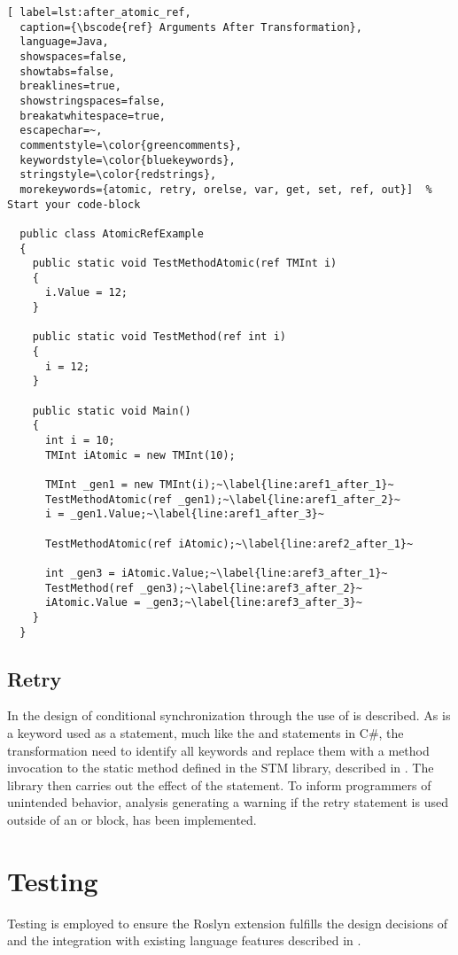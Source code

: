 \begin{lstlisting}[ label=lst:after_atomic_ref,
  caption={\bscode{ref} Arguments After Transformation},
  language=Java,  
  showspaces=false,
  showtabs=false,
  breaklines=true,
  showstringspaces=false,
  breakatwhitespace=true,
  escapechar=~,
  commentstyle=\color{greencomments},
  keywordstyle=\color{bluekeywords},
  stringstyle=\color{redstrings},
  morekeywords={atomic, retry, orelse, var, get, set, ref, out}]  % Start your code-block

  public class AtomicRefExample
  {
    public static void TestMethodAtomic(ref TMInt i)
    {
      i.Value = 12;
    }

    public static void TestMethod(ref int i)
    {
      i = 12;
    }

    public static void Main()
    {
      int i = 10;
      TMInt iAtomic = new TMInt(10);

      TMInt _gen1 = new TMInt(i);~\label{line:aref1_after_1}~
      TestMethodAtomic(ref _gen1);~\label{line:aref1_after_2}~
      i = _gen1.Value;~\label{line:aref1_after_3}~

      TestMethodAtomic(ref iAtomic);~\label{line:aref2_after_1}~

      int _gen3 = iAtomic.Value;~\label{line:aref3_after_1}~
      TestMethod(ref _gen3);~\label{line:aref3_after_2}~
      iAtomic.Value = _gen3;~\label{line:aref3_after_3}~
    }
  }
\end{lstlisting}


\subsection{Retry}
In  the design of conditional synchronization through the use of  is described. As  is a keyword used as a statement, much like the  and  statements in C\#, the transformation need to identify all  keywords and replace them with a method invocation to the static method  defined in the \ac{STM} library, described in . The library then carries out the effect of the  statement. To inform programmers of unintended behavior, analysis generating a warning if the retry statement is used outside of an  or  block, has been implemented. 

\section{Testing}
Testing is employed to ensure the Roslyn extension fulfills the design decisions of \stmnamesp and the integration with existing language features described in .

